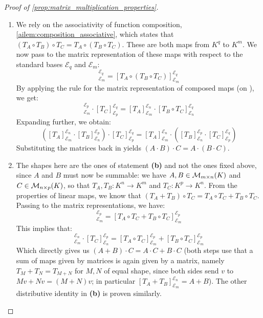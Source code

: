 \begin{proof}[Proof of \cref{prop:matrix_multiplication_properties}]
\begin{enumerate}[label=\textbf{(\alph*)}]
    \item We rely on the associativity of function composition, \cref{ailem:composition_associative}, which states that $(T_A \circ T_B) \circ T_C = T_A \circ (T_B \circ T_C)$. These are both maps from $K^q$ to $K^m$. We now pass to the matrix representation of these maps with respect to the standard bases $\mathcal{E}_q$ and $\mathcal{E}_m$:
    \begin{equation*}
        [(T_A \circ T_B) \circ T_C]_{\mathcal{E}_m}^{\mathcal{E}_q} = [T_A \circ (T_B \circ T_C)]_{\mathcal{E}_m}^{\mathcal{E}_q}
    \end{equation*}
    By applying the rule for the matrix representation of composed maps (on ), we get:
    \begin{equation*}
        [T_A \circ T_B]_{\mathcal{E}_m}^{\mathcal{E}_p} \cdot [T_C]_{\mathcal{E}_p}^{\mathcal{E}_q} = [T_A]_{\mathcal{E}_m}^{\mathcal{E}_n} \cdot [T_B \circ T_C]_{\mathcal{E}_n}^{\mathcal{E}_q}
    \end{equation*}
    Expanding further, we obtain:
    \begin{equation*}
        \left([T_A]_{\mathcal{E}_m}^{\mathcal{E}_n} \cdot [T_B]_{\mathcal{E}_n}^{\mathcal{E}_p}\right) \cdot [T_C]_{\mathcal{E}_p}^{\mathcal{E}_q} = [T_A]_{\mathcal{E}_m}^{\mathcal{E}_n} \cdot \left([T_B]_{\mathcal{E}_n}^{\mathcal{E}_p} \cdot [T_C]_{\mathcal{E}_p}^{\mathcal{E}_q}\right)
    \end{equation*}
    Substituting the matrices back in yields $(A \cdot B) \cdot C = A \cdot (B \cdot C)$.
    
    \item
    The shapes here are the ones of statement \textbf{(b)} and not the ones fixed above, since $A$ and $B$ must now be summable: we have $A, B \in \mathcal{M}_{m \times n}(K)$ and $C \in \mathcal{M}_{n \times p}(K)$, so that $T_A, T_B: K^n \to K^m$ and $T_C: K^p \to K^n$.
    From the properties of linear maps, we know that $(T_A + T_B) \circ T_C = T_A \circ T_C + T_B \circ T_C$. Passing to the matrix representations, we have:
    \begin{equation*}
        [(T_A + T_B) \circ T_C]_{\mathcal{E}_m}^{\mathcal{E}_p} = [T_A \circ T_C + T_B \circ T_C]_{\mathcal{E}_m}^{\mathcal{E}_p}
    \end{equation*}
    This implies that:
    \begin{equation*}
        [T_A + T_B]_{\mathcal{E}_m}^{\mathcal{E}_n} \cdot [T_C]_{\mathcal{E}_n}^{\mathcal{E}_p} = [T_A \circ T_C]_{\mathcal{E}_m}^{\mathcal{E}_p} + [T_B \circ T_C]_{\mathcal{E}_m}^{\mathcal{E}_p}
    \end{equation*}
    Which directly gives us $(A + B) \cdot C = A \cdot C + B \cdot C$ (both steps use that a sum of maps given by matrices is again given by a matrix, namely $T_M + T_N = T_{M+N}$ for $M, N$ of equal shape, since both sides send $v$ to $Mv + Nv = (M+N)v$; in particular $[T_A + T_B]_{\mathcal{E}_m}^{\mathcal{E}_n} = A + B$). The other distributive identity in \textbf{(b)} is proven similarly.
    

\end{enumerate}
\end{proof}
